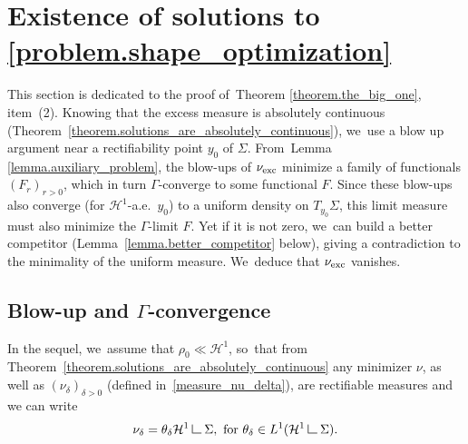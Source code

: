 \documentclass[JEP,XML,SOM,Unicode,NoFloatCountersInSection,published]{cedram}
\theoremstyle{definition}
\newcommand\LM[1]{\hbox{\vrule width.5pt \vbox to#1pt{\vfill \hrule width#1pt height.5pt}}}
\newcommand\LL{{\mathchoice {\>\LM7\>}{\>\LM7\>}{\,\LM5\,}{\,\LM{3.35}\,}}}
\newcommand{\mres}{\LL}
\newcommand\cH{\mathcal{H}}
\newcommand{\nuexc}{\nu_{\textup{exc}}}
\begin{document}
\section{Existence of solutions to \texorpdfstring{\eqref{problem.shape_optimization}}{eqref}}\label{section.blowup}
This section is dedicated to the proof of~Theorem \ref{theorem.the_big_one}, item~(2). Knowing
that the excess measure is absolutely continuous (Theorem~\ref{theorem.solutions_are_absolutely_continuous}), we~use
a blow up argument near a rectifiability point $y_0$ of $\Sigma$.
From~Lemma \ref{lemma.auxiliary_problem}, the blow-ups of $\nuexc$ minimize a family of functionals $(F_r)_{r > 0}$, which in turn $\Gamma$-converge to some functional $F$.
Since these blow-ups also converge (for $\cH^1$-a.e.~$y_0$) to a uniform density on $T_{y_0}\Sigma$, this limit measure must also minimize the $\Gamma$-limit $F$.
Yet if it is not zero, we~can build a better competitor (Lemma~\ref{lemma.better_competitor} below), giving a contradiction to the minimality of the uniform measure. We~deduce that $\nuexc$ vanishes.

\subsection{Blow-up and $\Gamma$-convergence}\label{sec.gamma_convergence}
In the sequel, we~assume that $\rho_0 \ll \mathcal{H}^1$, so~that from Theorem~\ref{theorem.solutions_are_absolutely_continuous} any minimizer $\nu$, as well as ${(\nu_\delta)}_{\delta > 0}$ (defined in~\eqref{measure_nu_delta}), are rectifiable measures and we can write
\[
\nu_\delta = \theta_\delta \mathcal{H}^1\mres \Sigma,
\text{ for }
\theta_\delta \in L^1(\cH^1\mres \Sigma).
\]
\end{document}

